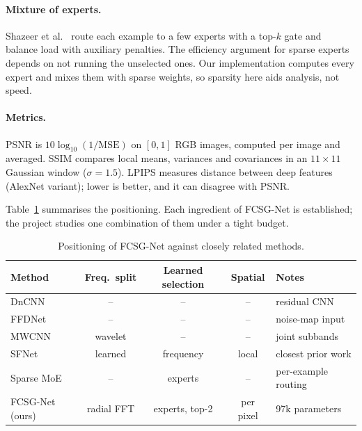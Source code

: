 \documentclass[12pt,a4paper,oneside]{NITR}
\newcommand{\fcsg}{FCSG-Net}
\begin{document}
\paragraph{Mixture of experts.} Shazeer et al.\ \cite{shazeer2017moe} route
each example to a few experts with a top-$k$ gate and balance load with
auxiliary penalties. The efficiency argument for sparse experts depends on
not running the unselected ones. Our implementation computes every expert and
mixes them with sparse weights, so sparsity here aids analysis, not speed.

\paragraph{Metrics.} PSNR is $10\log_{10}(1/\mathrm{MSE})$ on $[0,1]$ RGB
images, computed per image and averaged. SSIM compares local means, variances
and covariances in an $11\times11$ Gaussian window ($\sigma=1.5$). LPIPS
\cite{zhang2018lpips} measures distance between deep features (AlexNet
variant); lower is better, and it can disagree with PSNR.

Table~\ref{tab:gap} summarises the positioning. Each ingredient of \fcsg{} is
established; the project studies one combination of them under a tight
budget.

\begin{table}[htbp]
	\centering
	\caption{Positioning of \fcsg{} against closely related methods.}
	\label{tab:gap}
	\small
	\begin{tabular}{@{}lcccl@{}}
		\toprule
		Method & Freq.\ split & Learned selection & Spatial & Notes \\
		\midrule
		DnCNN \cite{zhang2017dncnn}      & --         & --              & --        & residual CNN \\
		FFDNet \cite{zhang2018ffdnet}    & --         & --              & --        & noise-map input \\
		MWCNN \cite{liu2018mwcnn}        & wavelet    & --              & --        & joint subbands \\
		SFNet \cite{cui2023sfnet}        & learned    & frequency       & local     & closest prior work \\
		Sparse MoE \cite{shazeer2017moe} & --         & experts         & --        & per-example routing \\
		\fcsg{} (ours)                   & radial FFT & experts, top-2  & per pixel & 97k parameters \\
		\bottomrule
	\end{tabular}
\end{table}
\end{document}
